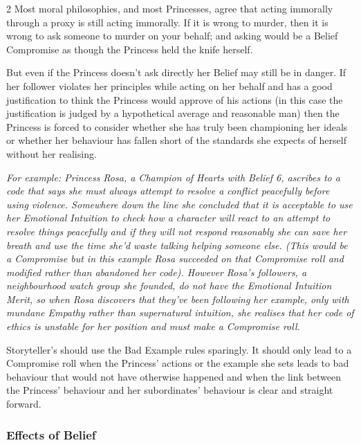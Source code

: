 \begin{multicols}{2}
Most moral philosophies, and most Princesses, agree that acting immorally through a proxy is still acting immorally. If it is wrong to murder, then it is wrong to ask someone to murder on your behalf; and asking would be a Belief Compromise as though the Princess held the knife herself. 

But even if the Princess doesn't ask directly her Belief may still be in danger. If her follower violates her principles while acting on her behalf and has a good justification to think the Princess would approve of his actions (in this case the justification is judged by a hypothetical average and reasonable man) then the Princess is forced to consider whether she has truly been championing her ideals or whether her behaviour has fallen short of the standards she expects of herself without her realising. 

\textit{For example: Princess Rosa, a Champion of Hearts with Belief 6, ascribes to a code that says she must always attempt to resolve a conflict peacefully before using violence. Somewhere down the line she concluded that it is acceptable to use her Emotional Intuition to check how a character will react to an attempt to resolve things peacefully and if they will not respond reasonably she can save her breath and use the time she'd waste talking helping someone else. (This would be a Compromise but in this example Rosa succeeded on that Compromise roll and modified rather than abandoned her code). However Rosa's followers, a neighbourhood watch group she founded, do not have the Emotional Intuition Merit, so when Rosa discovers that they've been following her example, only with mundane Empathy rather than supernatural intuition, she realises that her code of ethics is unstable for her position and must make a Compromise roll.}

Storyteller's should use the Bad Example rules sparingly. It should only lead to a Compromise roll when the Princess' actions or the example she sets leads to bad behaviour that would not have otherwise happened and when the link between the Princess' behaviour and her subordinates' behaviour is clear and straight forward. 


\subsubsection*{Effects of Belief}


\end{multicols}
